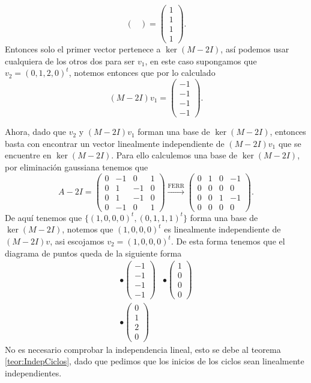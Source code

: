 \begin{example}
\[\begin{pmatrix}
      \end{pmatrix} = \begin{pmatrix}
        1 \\ 1 \\ 1 \\ 1
      \end{pmatrix}.
  \]
  Entonces solo el primer vector pertenece a $\ker(M-2I)$, así podemos usar cualquiera de los otros dos para ser $v_1$, en este caso supongamos que $v_2 = (0,1,2,0)^t$, notemos entonces que por lo calculado
    \[
      (M-2I)v_1 = \begin{pmatrix}
        -1 \\ -1 \\ -1 \\ -1
      \end{pmatrix}.
    \]

  Ahora, dado que $v_2$ y $(M-2I)v_1$ forman una base de $\ker(M-2I)$, entonces basta con encontrar un vector linealmente independiente de $(M-2I)v_1$ que se encuentre en $\ker(M-2I)$. Para ello calculemos una base de $\ker(M-2I)$, por eliminación gaussiana tenemos que
    \[
      A-2I = \begin{pmatrix} 0 & -1 & 0 & 1 \\ 0 & 1 & -1 & 0 \\ 0 & 1 & -1 & 0 \\ 0 & -1 &0 & 1 \end{pmatrix}
        \xrightarrow{\text{FERR}}
        \begin{pmatrix} 0 & 1 & 0 & -1 \\ 0 & 0 & 0 & 0 \\ 0 & 0 & 1 & -1 \\ 0 & 0 & 0 & 0 \end{pmatrix}.
    \]
  De aquí tenemos que $\{(1,0,0,0)^t, (0,1,1,1)^t\}$ forma una base de $\ker(M-2I)$, notemos que $(1,0,0,0)^t$ es linealmente independiente de $(M-2I)v$, asi escojamos $v_2 = (1,0,0,0)^t$. De esta forma tenemos que el diagrama de puntos queda de la siguiente forma
  \[
    \begin{array}{ll}
      \bullet \begin{pmatrix} -1 \\ -1 \\ -1 \\ -1 \end{pmatrix} & \bullet \begin{pmatrix}1 \\ 0 \\ 0 \\ 0\end{pmatrix}\\
      \bullet \begin{pmatrix} 0 \\ 1 \\ 2 \\ 0 \end{pmatrix}
    \end{array}
  \]
  No es necesario comprobar la independencia lineal, esto se debe al teorema \ref{teor:IndepCiclos}, dado que pedimos que los inicios de los ciclos sean linealmente independientes.


\end{example}
